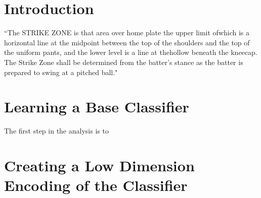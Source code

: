\documentclass[bj, preprint]{imsart}
\begin{document}


\section{Introduction}\label{sec:intro}
``The STRIKE ZONE is that area over home plate the upper limit ofwhich is a horizontal line at the midpoint between the top of the shoulders and the top of the uniform pants, and the lower level is a line at thehollow beneath the kneecap. 
The Strike Zone shall be determined from the batter’s stance as the batter is prepared to swing at a pitched ball."\cite{mlbrules}


\section{Learning a Base Classifier}\label{sec:base}
The first step in the analysis is to 


\section{Creating a Low Dimension Encoding of the Classifier}\label{sec:lowdim}




{}
\end{document}
